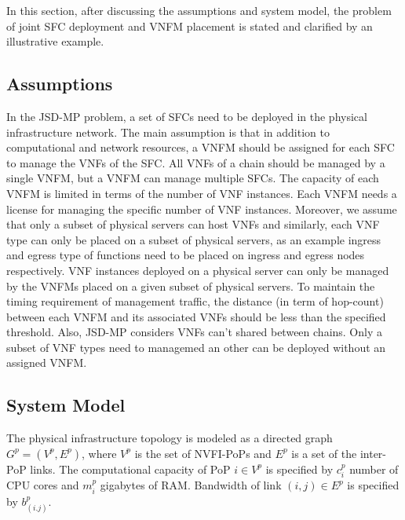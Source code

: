 In this section, after discussing the assumptions and system model, the problem of joint SFC deployment and VNFM placement is stated and clarified by an illustrative example.

\subsection{Assumptions}\label{assumptions}
In the JSD-MP problem, a set of SFCs need to be deployed in the physical infrastructure network.
The main assumption is that in addition to computational and network resources,
a VNFM should be assigned for each SFC to manage the VNFs of the SFC.
All VNFs of a chain should be managed by a single VNFM, but a VNFM can manage multiple SFCs.
The capacity of each VNFM is limited in terms of the number of VNF instances.
Each VNFM needs a license for managing the specific number of VNF instances.
Moreover, we assume that only a subset of physical servers can host VNFs and similarly,
each VNF type can only be placed on a subset of physical servers,
as an example ingress and egress type of functions need to be placed on ingress and egress nodes respectively.
VNF instances deployed on a physical server can only be managed by the VNFMs placed on a given subset of physical servers.
To maintain the timing requirement of management traffic,
the distance (in term of hop-count) between each VNFM and its associated VNFs should be less than the specified threshold.
Also, JSD-MP considers VNFs can't shared between chains.
Only a subset of VNF types need to managemed an other can be deployed without an assigned VNFM.

\subsection{System Model}
%
%

The physical infrastructure topology is modeled as a directed graph \(G^p=(V^p, E^p)\),
where \(V^p\) is the set of NVFI-PoPs and \(E^p\) is a set of the inter-PoP links.
The computational capacity of PoP \(i \in V^p\) is specified by \(c^p_i\) number of CPU cores and \(m^p_i\) gigabytes of RAM.
Bandwidth of link \((i,j) \in E^p\) is specified by \(b^p_{(i.j)}\).

